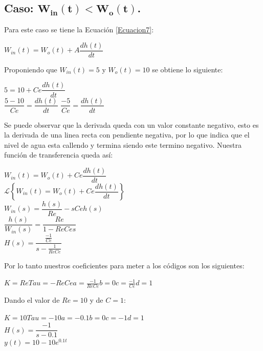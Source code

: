 \documentclass[12pt,a4paper]{article}
\begin{document}
\subsection{Caso: $\mathbf{W_{in}(t) < W_{o}(t)}$.}
Para este caso se tiene la Ecuación \ref{Ecuacion7}:
\begin{center}
$W_{in}(t) = W_{o}(t) + A\dfrac{dh(t)}{dt}$
\end{center}
Proponiendo que $W_{in}(t) = 5$ y $W_{o}(t) = 10$ se obtiene lo siguiente:
\begin{center}
$5 = 10 + Ce\dfrac{dh(t)}{dt}$\\[12pt]
$\dfrac{5-10}{Ce} = \dfrac{dh(t)}{dt}$
$\dfrac{-5}{Ce} = \dfrac{dh(t)}{dt}$
\end{center}
Se puede observar que la derivada queda con un valor constante negativo, esto es la derivada de una linea recta con pendiente negativa, por lo que indica que el nivel de agua esta callendo y termina siendo este termino negativo. Nuestra función de transferencia queda así:
\begin{center}
$W_{in}(t) = W_{o}(t) + Ce\dfrac{dh(t)}{dt}$\\[12pt]
$\mathcal{L}\left\lbrace W_{in}(t) = W_{o}(t) + Ce\dfrac{dh(t)}{dt}\right\rbrace$\\[12pt]
$W_{in}(s) = \dfrac{h(s)}{Re} - sCeh(s)$\\[12pt]
$\dfrac{h(s)}{W_{in}(s)} = \dfrac{Re}{1-ReCes}$\\[12pt]
$H(s) = \dfrac{\frac{-1}{Ce}}{s-\frac{1}{ReCe}}$
\end{center}
Por lo tanto nuestros coeficientes para meter a los códigos son los siguientes:
\begin{center}
$K = Re$\hspace{3cm}$Tau = -ReCe$\hspace{3cm}$a = \frac{-1}{ReCe}$\hspace{3cm}$b = 0$\hspace{3cm}$c = \frac{-1}{Ce}$\hspace{3cm}$d = 1$
\end{center} 
Dando el valor de $Re = 10$ y de $C=1$:
\begin{center}
$K = 10$\hspace{3cm}$Tau = -10$\hspace{3cm}$a = -0.1$\hspace{3cm}$b = 0$\hspace{3cm}$c =-1$\hspace{3cm}$d = 1$\\[12pt]
$H(s) = \dfrac{-1}{s - 0.1}$\\[12pt]
$y(t) = 10 - 10e^{0.1t}$\\[12pt]
\end{center} 
\end{document}
